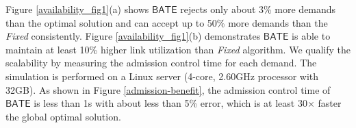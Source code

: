 \documentclass[sigconf]{acmart}
\begin{document}

Figure \ref{availability_fig1}(a)  shows $\mathsf{BATE}$  rejects only about 3\% more demands than the optimal solution and can accept up to 50\% more demands than the \textit{Fixed} consistently.
Figure \ref{availability_fig1}(b) demonstrates  $\mathsf{BATE}$ is able to maintain at least 10\% higher link utilization than \textit{Fixed} algorithm.
We qualify the scalability by measuring the admission control time for each demand.
The simulation is performed on a Linux server (4-core, 2.60GHz processor with 32GB).
As shown in Figure \ref{admission-benefit}, the admission control time of $\mathsf{BATE}$ is less than 1s with about less than 5\% error, which is at least 30$\times$ faster the global optimal solution.
\end{document}
